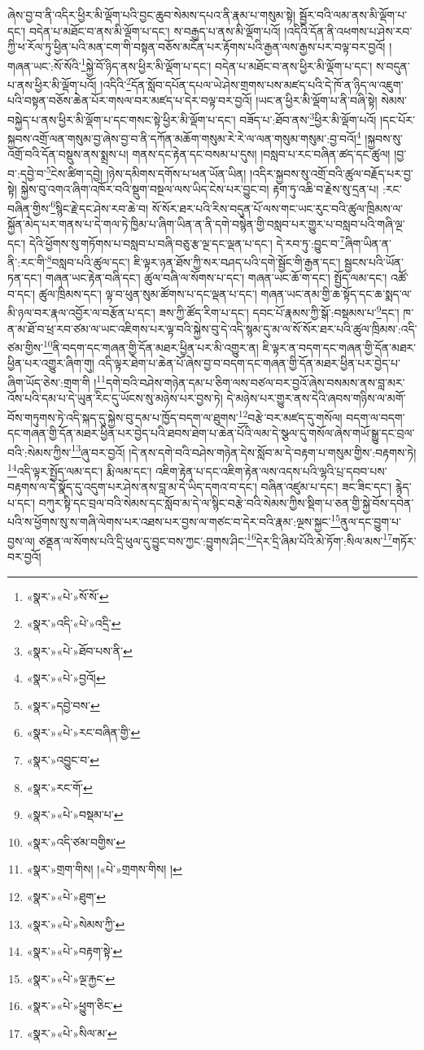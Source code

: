 ཞེས་བྱ་བ་ནི་འདིར་ཕྱིར་མི་ལྡོག་པའི་བྱང་ཆུབ་སེམས་དཔའ་ནི་རྣམ་པ་གསུམ་སྟེ། སྦྱོར་བའི་ལམ་ནས་མི་ལྡོག་པ་དང་། བདེན་པ་མཐོང་བ་ནས་མི་ལྡོག་པ་དང་། ས་བརྒྱད་པ་ནས་མི་ལྡོག་པའོ། །འདིའི་དོན་ནི་འཕགས་པ་ཤེས་རབ་ཀྱི་ཕ་རོལ་ཏུ་ཕྱིན་པའི་མན་ངག་གི་བསྟན་བཅོས་མངོན་པར་རྟོགས་པའི་རྒྱན་ལས་རྒྱས་པར་བལྟ་བར་བྱའོ། །གཞན་ཡང་:སོ་སོའི་\footnote{«སྣར་»«པེ་»སོ་སོ་}སྐྱེ་བོ་ཉིད་ནས་ཕྱིར་མི་ལྡོག་པ་དང་། བདེན་པ་མཐོང་བ་ནས་ཕྱིར་མི་ལྡོག་པ་དང་། ས་བདུན་པ་ནས་ཕྱིར་མི་ལྡོག་པའོ། །འདིའི་\footnote{«སྣར་»འདི་«པེ་»འདྲི་}དོན་སློབ་དཔོན་དཔལ་ཡེ་ཤེས་གྲགས་པས་མཛད་པའི་དེ་ཁོ་ན་ཉིད་ལ་འཇུག་པའི་བསྟན་བཅོས་ཆེན་པོར་གསལ་བར་མཛད་པ་དེར་བལྟ་བར་བྱའོ། །ཡང་ན་ཕྱིར་མི་ལྡོག་པ་ནི་བཞི་སྟེ། སེམས་བསྐྱེད་པ་ནས་ཕྱིར་མི་ལྡོག་པ་དང་གསང་སྟེ་ཕྱིར་མི་ལྡོག་པ་དང་། བཟོད་པ་:ཐོབ་ནས་\footnote{«སྣར་»«པེ་»ཐོབ་པས་ནི་}ཕྱིར་མི་ལྡོག་པའོ། །དང་པོར་སྐྱབས་འགྲོ་ལན་གསུམ་བྱ་ཞེས་བྱ་བ་ནི་དཀོན་མཆོག་གསུམ་རེ་རེ་ལ་ལན་གསུམ་གསུམ་:བྱ་བའོ།\footnote{«སྣར་»«པེ་»བྱའོ།} །སྐྱབས་སུ་འགྲོ་བའི་དོན་བསྡུས་ནས་སྨྲས་པ། གནས་དང་རྟེན་དང་བསམ་པ་དུས། །བསླབ་པ་རང་བཞིན་ཚད་དང་ཚུལ། །བྱ་བ་:དབྱེ་བ་\footnote{«སྣར་»དབྱེ་བས་}ངེས་ཚིག་དབྱེ། །ཉེས་དམིགས་དགོས་པ་ཕན་ཡོན་ཡིན། །འདིར་སྐྱབས་སུ་འགྲོ་བའི་ཚུལ་བརྗོད་པར་བྱ་སྟེ། སྐྱེས་བུ་འགའ་ཞིག་འཁོར་བའི་སྡུག་བསྔལ་ལས་ཡིད་ངེས་པར་བྱུང་བ། རྟག་ཏུ་འཆི་བ་རྗེས་སུ་དྲན་པ། :རང་བཞིན་གྱིས་\footnote{«སྣར་»«པེ་»རང་བཞིན་གྱི་}སྙིང་རྗེ་དང་ཤེས་རབ་ཆེ་བ། སོ་སོར་ཐར་པའི་རིས་བདུན་པོ་ལས་གང་ཡང་རུང་བའི་ཚུལ་ཁྲིམས་ལ་སྐྱོན་མེད་པར་གནས་པ་དེ་གལ་ཏེ་ཁྱིམ་པ་ཞིག་ཡིན་ན་ནི་དགེ་བསྙེན་གྱི་བསླབ་པར་གྱུར་པ་བསླབ་པའི་གཞི་ལྔ་དང་། དེའི་ཕྱོགས་སུ་གཏོགས་པ་བསླབ་པ་བཞི་བཅུ་རྩ་ལྔ་དང་ལྡན་པ་དང་། དེ་རབ་ཏུ་:བྱུང་བ་\footnote{«སྣར་»འབྱུང་བ་}ཞིག་ཡིན་ན་ནི་:རང་གི་\footnote{«སྣར་»རང་གོ་}བསླབ་པའི་ཚུལ་དང་། ཇི་ལྟར་ཉན་ཐོས་ཀྱི་སར་བཤད་པའི་དགེ་སྦྱོང་གི་རྒྱན་དང་། སྦྱངས་པའི་ཡོན་ཏན་དང་། གཞན་ཡང་རྟེན་བཞི་དང་། ཚུལ་བཞི་ལ་སོགས་པ་དང་། གཞན་ཡང་ཆོ་ག་དང་། སྤྱོད་ལམ་དང་། འཚོ་བ་དང་། ཚུལ་ཁྲིམས་དང་། ལྟ་བ་ཕུན་སུམ་ཚོགས་པ་དང་ལྡན་པ་དང་། གཞན་ཡང་ནམ་གྱི་ཆ་སྟོད་དང་ཆ་སྨད་ལ་མི་ཉལ་བར་རྣལ་འབྱོར་ལ་བརྩོན་པ་དང་། ཟས་ཀྱི་ཚོད་རིག་པ་དང་། དབང་པོ་རྣམས་ཀྱི་སྒོ་:བསྡམས་པ་\footnote{«སྣར་»«པེ་»བསྡམ་པ་}དང་། ཁ་ན་མ་ཐོ་བ་ཕྲ་རབ་ཙམ་ལ་ཡང་འཇིགས་པར་ལྟ་བའི་སྐྱེས་བུ་དེ་འདི་སྙམ་དུ་མ་ལ་སོ་སོར་ཐར་པའི་ཚུལ་ཁྲིམས་:འདི་ཙམ་གྱིས་\footnote{«སྣར་»འདི་ཙམ་བགྱིས་}ནི་བདག་དང་གཞན་གྱི་དོན་མཐར་ཕྱིན་པར་མི་འགྱུར་ན། ཇི་ལྟར་ན་བདག་དང་གཞན་གྱི་དོན་མཐར་ཕྱིན་པར་འགྱུར་ཞིག་གུ། འདི་ལྟར་ཐེག་པ་ཆེན་པོ་ཞེས་བྱ་བ་བདག་དང་གཞན་གྱི་དོན་མཐར་ཕྱིན་པར་བྱེད་པ་ཞིག་ཡོད་ཅེས་:གྲག་གི །\footnote{«སྣར་»གྲག་གིས། །«པེ་»གྲགས་གིས། །}དགེ་བའི་བཤེས་གཉེན་དམ་པ་ཅིག་ལས་བཙལ་བར་བྱའོ་ཞེས་བསམས་ནས་བླ་མར་འོས་པའི་དམ་པ་དེ་ཡུན་རིང་དུ་ཡོངས་སུ་མཉེས་པར་བྱས་ཏེ། དེ་མཉེས་པར་གྱུར་ནས་དེའི་ཞབས་གཉིས་ལ་མགོ་བོས་གཏུགས་ཏེ་འདི་སྐད་དུ་སྐྱེས་བུ་དམ་པ་ཁྱོད་བདག་ལ་ཐུགས་\footnote{«སྣར་»«པེ་»ཐུག་}བརྩེ་བར་མཛད་དུ་གསོལ། བདག་ལ་བདག་དང་གཞན་གྱི་དོན་མཐར་ཕྱིན་པར་བྱེད་པའི་ཐབས་ཐེག་པ་ཆེན་པོའི་ལམ་དེ་སྩལ་དུ་གསོལ་ཞེས་གཡོ་སྒྱུ་དང་བྲལ་བའི་:སེམས་ཀྱིས་\footnote{«སྣར་»«པེ་»སེམས་ཀྱི་}ཞུ་བར་བྱའོ། །དེ་ནས་དགེ་བའི་བཤེས་གཉེན་དེས་སློབ་མ་དེ་བརྟག་པ་གསུམ་གྱིས་:བརྟགས་ཏེ། \footnote{«སྣར་»«པེ་»བརྟག་སྟེ་}འདི་ལྟར་སྤྱོད་ལམ་དང་། རྨི་ལམ་དང་། འཇིག་རྟེན་པ་དང་འཇིག་རྟེན་ལས་འདས་པའི་ལྷའི་པྲ་དབབ་པས་བརྟགས་ལ་དེ་སྣོད་དུ་འདུག་པར་ཤེས་ནས་བླ་མ་དེ་ཡིད་དགའ་བ་དང་། བཞིན་འཛུམ་པ་དང་། ཟང་ཟིང་དང་། རྙེད་པ་དང་། བཀུར་སྟི་དང་བྲལ་བའི་སེམས་དང་སློབ་མ་དེ་ལ་སྙིང་བརྩེ་བའི་སེམས་ཀྱིས་སྡིག་པ་ཅན་གྱི་སྐྱེ་བོས་དབེན་པའི་ས་ཕྱོགས་སུ་ས་གཞི་ལེགས་པར་འཐས་པར་བྱས་ལ་གཙང་བ་དེར་བའི་རྣམ་:ལྔས་སྐྱང་\footnote{«སྣར་»«པེ་»ལྔ་རྐྱང་}ནུལ་དང་བྱུག་པ་བྱས་ལ། ཙནྡན་ལ་སོགས་པའི་དྲི་ཕུལ་དུ་བྱུང་བས་ཀྱང་:བྱུགས་ཤིང་\footnote{«སྣར་»«པེ་»ཕྱུག་ཅིང་}དེར་དྲི་ཞིམ་པོའི་མེ་ཏོག་:སིལ་མས་\footnote{«སྣར་»«པེ་»སིལ་མ་}གཏོར་བར་བྱའོ། 